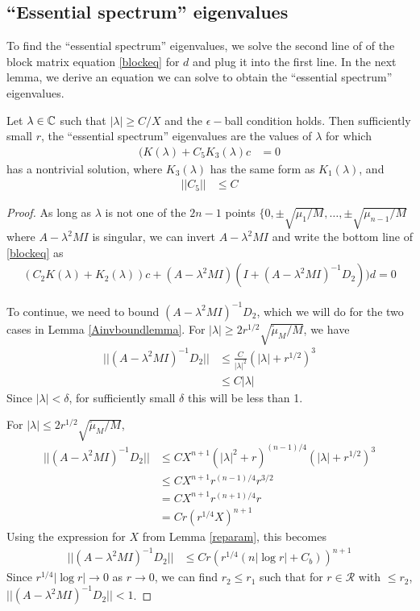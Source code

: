 \documentclass[thesis.tex]{subfiles}
\begin{document}
\subsection{``Essential spectrum'' eigenvalues}

To find the ``essential spectrum'' eigenvalues, we solve the second line of of the block matrix equation \eqref{blockeq} for $d$ and plug it into the first line. In the next lemma, we derive an equation we can solve to obtain the ``essential spectrum'' eigenvalues.

\begin{lemma}\label{ceqlemma}
Let $\lambda \in \mathbb{C}$ such that $|\lambda| \geq C/X$ and the $\epsilon-$ball condition holds. Then sufficiently small $r$, the ``essential spectrum'' eigenvalues are the values of $\lambda$ for which 
\begin{align}\label{eqforc}
(K(\lambda) + C_5 K_3(\lambda)c &= 0
\end{align}
has a nontrivial solution, where $K_3(\lambda)$ has the same form as $K_1(\lambda)$, and
\begin{align*}
||C_5|| &\leq C
\end{align*}

\begin{proof}
As long as $\lambda$ is not one of the $2n - 1$ points $\{0, \pm \sqrt{\mu_1/M}, \dots, \pm \sqrt{\mu_{n-1}/M}$ where $A - \lambda^2 MI$ is singular, we can invert $A - \lambda^2 MI$ and write the bottom line of \eqref{blockeq} as 
\begin{align}\label{blockeqbottom}
(C_2 K(\lambda) + K_2(\lambda))c 
+ (A - \lambda^2 MI)(I + (A - \lambda^2 MI)^{-1} D_2))d = 0
\end{align}

To continue, we need to bound $(A - \lambda^2 MI)^{-1} D_2$, which we will do for the two cases in Lemma \ref{Ainvboundlemma}. For $|\lambda| \geq 2 r^{1/2} \sqrt{\tilde{\mu}_M/M}$, we have
\begin{align*}
|| (A - \lambda^2 MI)^{-1} D_2 || &\leq \frac{C}{|\lambda|^2} (|\lambda| + r^{1/2})^3 \\ 
&\leq C |\lambda|
\end{align*}
Since $|\lambda| < \delta$, for sufficiently small $\delta$ this will be less than 1. 

For $|\lambda| \leq 2 r^{1/2} \sqrt{\tilde{\mu}_M/M}$,
\begin{align*}
|| (A - \lambda^2 MI)^{-1} D_2 || &\leq C X^{n+1}\left( |\lambda|^2 + r \right)^{(n-1)/4} (|\lambda| + r^{1/2})^3 \\
&\leq C X^{n+1} r^{(n-1)/4} r^{3/2} \\ 
&= C X^{n+1} r^{(n+1)/4} r \\
&= C r (r^{1/4} X)^{n+1}
\end{align*}
Using the expression for $X$ from Lemma \ref{reparam}, this becomes
\begin{align*}
|| (A - \lambda^2 MI)^{-1} D_2 ||
&\leq C r \left( r^{1/4} (n |\log r| + C_b )\right)^{n+1}
\end{align*}
Since $r^{1/4} |\log r| \rightarrow 0$ as $r \rightarrow 0$, we can find $r_2 \leq r_1$ such that for $r \in \mathcal{R}$ with $\leq r_2$, $|| (A - \lambda^2 MI)^{-1} D_2 || < 1$. 


\end{proof}
\end{lemma}
\end{document}
